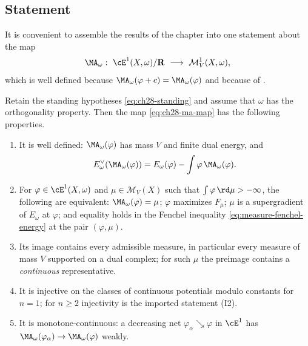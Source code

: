 \subsection{Statement}
\label{sec:ch28-cy-statement}

It is convenient to assemble the results of the chapter into one statement
about the map
\begin{equation}
\label{eq:ch28-ma-map}
 \MA_\omega:\ \cE^1(X,\omega)/\mathbf R\ \longrightarrow\
 \mathcal M^1_V(X,\omega),
\end{equation}
which is well defined because \(\MA_\omega(\varphi+c)=\MA_\omega(\varphi)\)
and because of \Cref{prop:ch28-dual-energy-of-ma}.

\begin{theorem}
\label{thm:ch28-calabi-yau}
Retain the standing hypotheses \eqref{eq:ch28-standing} and assume that
\(\omega\) has the orthogonality property.  Then the map
\eqref{eq:ch28-ma-map} has the following properties.
\begin{enumerate}
\item\label{itm:ch28-cy:into}
 It is well defined: \(\MA_\omega(\varphi)\) has mass \(V\) and finite dual
 energy, and
 \[
  E^\vee_\omega(\MA_\omega(\varphi))
  =E_\omega(\varphi)-\int\varphi\,\MA_\omega(\varphi).
 \]
\item\label{itm:ch28-cy:variational}
 For \(\varphi\in\cE^1(X,\omega)\) and \(\mu\in\mathcal M_V(X)\) such
 that \(\int\varphi\,\rd\mu> -\infty\), the following are equivalent:
 \(\MA_\omega(\varphi)=\mu\); \(\varphi\)
 maximizes \(F_\mu\); \(\mu\) is a supergradient of \(E_\omega\) at
 \(\varphi\); and equality holds in the Fenchel inequality
 \eqref{eq:measure-fenchel-energy} at the pair \((\varphi,\mu)\).
\item\label{itm:ch28-cy:onto}
 Its image contains every admissible measure, in particular every measure of
 mass \(V\) supported on a dual complex; for such \(\mu\) the preimage
 contains a \emph{continuous} representative.
\item\label{itm:ch28-cy:injective}
 It is injective on the classes of continuous potentials modulo constants
 for \(n=1\); for \(n\geq2\) injectivity is the imported statement
 \textup{(I2)}.
\item\label{itm:ch28-cy:usc}
 It is monotone-continuous: a decreasing net
 \(\varphi_\alpha\searrow\varphi\) in \(\cE^1\) has
 \(\MA_\omega(\varphi_\alpha)\to\MA_\omega(\varphi)\) weakly.
\end{enumerate}
\end{theorem}


